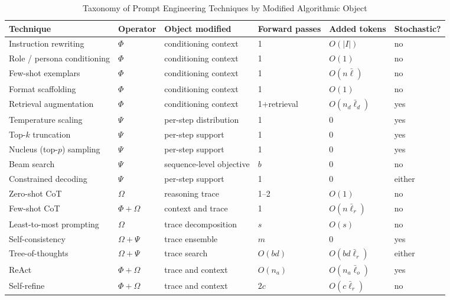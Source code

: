 \documentclass[conference]{IEEEtran}
\begin{document}
\begin{table}[htbp]
\caption{Taxonomy of Prompt Engineering Techniques by Modified Algorithmic Object}
\centering
\footnotesize
\begin{tabular}{llllll}
\toprule
\textbf{Technique} & \textbf{Operator} & \textbf{Object modified} & \textbf{Forward passes} & \textbf{Added tokens} & \textbf{Stochastic?} \\
\midrule
Instruction rewriting & $\Phi$ & conditioning context & 1 & $O(|I|)$ & no \\
Role / persona conditioning & $\Phi$ & conditioning context & 1 & $O(1)$ & no \\
Few-shot exemplars & $\Phi$ & conditioning context & 1 & $O(n\bar{\ell})$ & no \\
Format scaffolding & $\Phi$ & conditioning context & 1 & $O(1)$ & no \\
Retrieval augmentation & $\Phi$ & conditioning context & 1+retrieval & $O(n_d\bar{\ell}_d)$ & yes \\
\midrule
Temperature scaling & $\Psi$ & per-step distribution & 1 & 0 & yes \\
Top-$k$ truncation & $\Psi$ & per-step support & 1 & 0 & yes \\
Nucleus (top-$p$) sampling & $\Psi$ & per-step support & 1 & 0 & yes \\
Beam search & $\Psi$ & sequence-level objective & $b$ & 0 & no \\
Constrained decoding & $\Psi$ & per-step support & 1 & 0 & either \\
\midrule
Zero-shot CoT & $\Omega$ & reasoning trace & 1--2 & $O(1)$ & no \\
Few-shot CoT & $\Phi + \Omega$ & context and trace & 1 & $O(n\bar{\ell}_r)$ & no \\
Least-to-most prompting & $\Omega$ & trace decomposition & $s$ & $O(s)$ & no \\
Self-consistency & $\Omega + \Psi$ & trace ensemble & $m$ & 0 & yes \\
Tree-of-thoughts & $\Omega + \Psi$ & trace search & $O(bd)$ & $O(bd\bar{\ell}_r)$ & either \\
ReAct & $\Phi + \Omega$ & trace and context & $O(n_a)$ & $O(n_a\bar{\ell}_o)$ & yes \\
Self-refine & $\Phi + \Omega$ & trace and context & $2c$ & $O(c\bar{\ell}_r)$ & no \\
\bottomrule
\end{tabular}
\label{tab:taxonomy}
\end{table}
\end{document}
